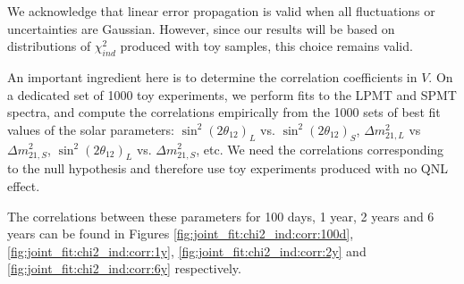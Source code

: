 \documentclass[../main.tex]{subfiles}
\begin{document}
We acknowledge that linear error propagation is valid when all fluctuations or uncertainties are Gaussian. However, since our results will be based on distributions of $\chi^2_{ind}$ produced with toy samples, this choice remains valid.


An important ingredient here is to determine the correlation coefficients in $V$. On a dedicated set of 1000 toy experiments, we perform fits to the LPMT and SPMT spectra, and compute the correlations empirically from the 1000 sets of best fit values of the solar parameters:  $\sin^2(2\theta_{12})_{L}$ vs. $\sin^2(2\theta_{12})_{S}$, $\Delta m^2_{21,L}$ vs $\Delta m^2_{21,S}$, $\sin^2(2\theta_{12})_{L}$ vs. $\Delta m^2_{21,S}$, etc. We need the correlations corresponding to the null hypothesis and therefore use toy experiments produced with no QNL effect.

The correlations between these parameters for 100 days, 1 year, 2 years and 6 years can be found in Figures \ref{fig:joint_fit:chi2_ind:corr:100d}, \ref{fig:joint_fit:chi2_ind:corr:1y}, \ref{fig:joint_fit:chi2_ind:corr:2y} and \ref{fig:joint_fit:chi2_ind:corr:6y} respectively.
\end{document}
